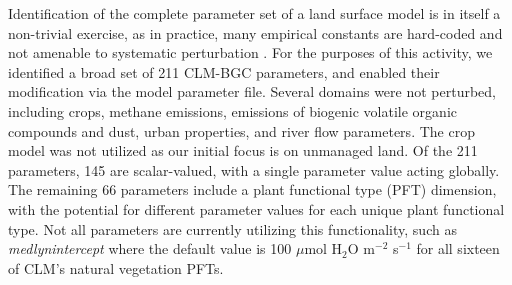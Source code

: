 \documentclass[draft]{agujournal2019}
\begin{document}
Identification of the complete parameter set of a land surface model is in itself a non-trivial exercise, as in practice, many empirical constants are hard-coded and not amenable to systematic perturbation \cite{mendoza2015,cuntz2016}. For the purposes of this activity, we identified a broad set of 211 CLM-BGC parameters, and enabled their modification via the model parameter file. Several domains were not perturbed, including crops, methane emissions, emissions of biogenic volatile organic compounds and dust, urban properties, and river flow parameters. The crop model was not utilized as our initial focus is on unmanaged land. Of the 211 parameters, 145 are scalar-valued, with a single parameter value acting globally. The remaining 66 parameters include a plant functional type (PFT) dimension, with the potential for different parameter values for each unique plant functional type. Not all parameters are currently utilizing this functionality, such as \textit{medlynintercept} where the default value is 100 $\mu$mol H$_2$O m$^{-2}$ s$^{-1}$ for all sixteen of CLM's natural vegetation PFTs.
\end{document}
